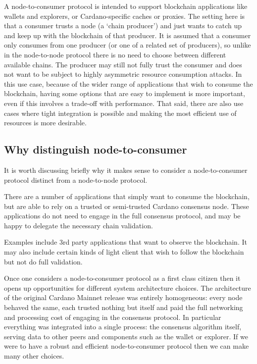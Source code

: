 \documentclass{article}
\theoremstyle{definition}{
  \newtheorem{lemma}{Lemma}[section] %
  \newtheorem{definition}[lemma]{Definition}
}
\theoremstyle{theorem}{
  \newtheorem{invariant}[lemma]{Invariant}
  \newtheorem{proofobligation}[lemma]{Proof Obligation}
}
\numberwithin{equation}{lemma}
\begin{document}
A node-to-consumer protocol is intended to support blockchain applications
like wallets and explorers, or Cardano-specific caches or proxies. The setting
here is that a consumer trusts a node (a `chain producer') and just wants to
catch up and keep up with the blockchain of that producer. It is assumed that
a consumer only consumes from one producer (or one of a related set of
producers), so unlike in the node-to-node protocol there is no need to choose
between different available chains. The producer may still not fully trust the
consumer and does not want to be subject to highly asymmetric resource
consumption attacks. In this use case, because of the wider range of
applications that wish to consume the blockchain, having some options that are
easy to implement is more important, even if this involves a trade-off with
performance. That said, there are also use cases where tight integration is
possible and making the most efficient use of resources is more desirable.

\subsection{Why distinguish node-to-consumer}

It is worth discussing briefly why it makes sense to consider a node-to-consumer
protocol distinct from a node-to-node protocol.

There are a number of applications that simply want to consume the blockchain,
but are able to rely on a trusted or semi-trusted Cardano consensus node. These
applications do not need to engage in the full consensus protocol, and may be
happy to delegate the necessary chain validation.

Examples include 3rd party applications that want to observe the blockchain.
It may also include certain kinds of light client that wish to follow the
blockchain but not do full validation.

Once one considers a node-to-consumer protocol as a first class citizen then
it opens up opportunities for different system architecture choices. The
architecture of the original Cardano Mainnet release was entirely homogeneous:
every node behaved the same, each trusted nothing but itself and paid the
full networking and processing cost of engaging in the consensus protocol.
In particular everything was integrated into a single process: the consensus
algorithm itself, serving data to other peers and components such as the wallet
or explorer. If we were to have a robust and efficient node-to-consumer
protocol then we can make many other choices.
\end{document}
